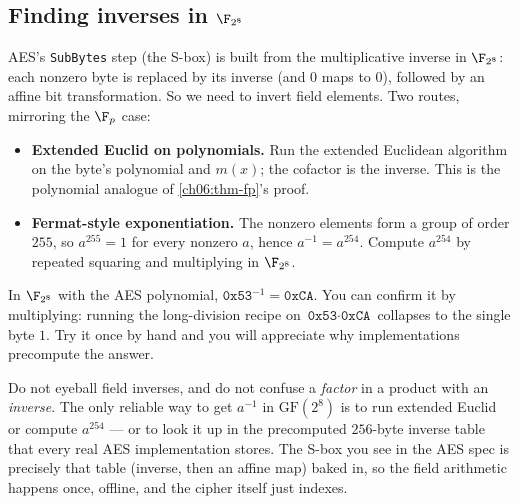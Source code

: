 \subsection{Finding inverses in $\F_{2^8}$}

AES's \texttt{SubBytes} step (the S-box) is built from the multiplicative
inverse in $\F_{2^8}$: each nonzero byte is replaced by its inverse (and $0$
maps to $0$), followed by an affine bit transformation. So we need to invert
field elements. Two routes, mirroring the $\F_p$ case:

\begin{itemize}
  \item \textbf{Extended Euclid on polynomials.} Run the extended Euclidean
        algorithm on the byte's polynomial and $m(x)$; the cofactor is the
        inverse. This is the polynomial analogue of
        \autoref{ch06:thm-fp}'s proof.
  \item \textbf{Fermat-style exponentiation.} The nonzero elements form a
        group of order $255$, so $a^{255} = 1$ for every nonzero $a$, hence
        $a^{-1} = a^{254}$. Compute $a^{254}$ by repeated squaring and
        multiplying in $\F_{2^8}$.
\end{itemize}

\begin{example}[An inverse]
\label{ch06:ex-inverse}
In $\F_{2^8}$ with the AES polynomial, $\texttt{0x53}^{-1} = \texttt{0xCA}$.
You can confirm it by multiplying: running the long-division recipe on
$\texttt{0x53}\cdot\texttt{0xCA}$ collapses to the single byte $1$. Try it
once by hand and you will appreciate why implementations precompute the
answer.
\end{example}

\begin{trapbox}
Do not eyeball field inverses, and do not confuse a \emph{factor} in a
product with an \emph{inverse}. The only reliable way to get $a^{-1}$ in
$\mathrm{GF}(2^8)$ is to run extended Euclid or compute $a^{254}$ --- or to
look it up in the precomputed $256$-byte inverse table that every real AES
implementation stores. The S-box you see in the AES spec is precisely that
table (inverse, then an affine map) baked in, so the field arithmetic happens
once, offline, and the cipher itself just indexes.
\end{trapbox}

